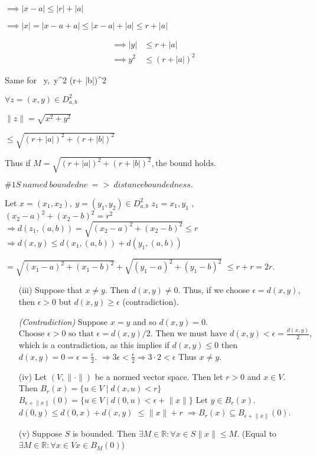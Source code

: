 \documentclass{article}
\theoremstyle{definition}
\numberwithin{equation}{section}
\begin{document}
$\implies |x-a| \leq | r| + | a| $

$\implies|x|=| x - a + a | \leq | x - a| + | a| \leq r + | a|$

\begin{align*}
\implies |y| & \leq r + |a| \\
\implies y^2 & \leq (r + |a|)^2
\end{align*}

Same for \ y,\ y^2 \leq (r+ |b|)^2 

$\forall z = (x,y) \in D^2_{a,b} $

$\|z\| = \sqrt{x^2 + y^2}$

$\leq \sqrt{(r+|a|)^2 + (r+|b|)^2}$

Thus if $M = \sqrt{(r+|a|)^2 + (r + |b|)^2} , \text{the bound holds.}$

$ \# 1S \ named \ boundedne \ =>\ distance boundedness. $

Let 
$x = (x_1, x_2), \ y = (y_1, y_2) \in D^2_{a,b} $
$ z_1 = {x_1,y_1} $ ,
$ (x_2 - a)^2 + (x_2 - b)^2 = r^2 $
$\Rightarrow d(z_1,(a,b)) = \sqrt{(x_2 - a)^2 + (x_2 - b)^2} \le r $
$\Rightarrow d(x,y) \leq d(x_1,(a,b)) + d(y_1,(a,b)) $

$ = \sqrt{(x_1 - a)^2 +(x_1 - b)^2} + \sqrt{(y_1 - a)^2 +(y_1 - b)^2} $ 
$ \le r + r = 2r. $
\begin{enumerate}
    \item[(iii)] Suppose that \(x \neq y\). Then \(d(x, y) \neq 0\). Thus, if we choose \(\epsilon = d(x, y)\), then \(\epsilon > 0\) but \(d(x, y) \geq \epsilon\) (contradiction).

    \textit{(Contradiction)} Suppose \(x = y\) and so \(d(x, y) = 0\).
    $
    \text{Choose } \epsilon > 0 \text{ so that } \epsilon = d(x, y)/2. \text{ Then we must have } d(x, y) < \epsilon = \frac{d(x, y)}{2},
    $
    which is a contradiction, as this implies if \(d(x, y) \leq 0\) then \(d(x, y) = 0 = \epsilon = \frac{\epsilon}{2}\).
    $
    \Rightarrow 3\epsilon < \frac{\epsilon}{2} \Rightarrow 3 \cdot 2 < \epsilon
    $
    Thus \(x \neq y\).

    \item[(iv)] Let \((V, \lVert \cdot \rVert)\) be a normed vector space. Then let \(r > 0\) and \(x \in V\). Then
    $
    B_r(x) = \{ u \in V \mid d(x, u) < r \}
    $
    $
    B_{\epsilon + \lVert x \rVert}(0) = \{ u \in V \mid d(0, u) < \epsilon + \lVert x \rVert \}
    $
    $
    \text{Let } y \in B_r(x).
    $
    $
    d(0, y) \leq d(0, x) + d(x, y)
    $
    $
    \leq \lVert x \rVert + r
    $
    $
    \Rightarrow B_r(x) \subseteq B_{\epsilon + \lVert x \rVert}(0).
    $

    \item[(v)] Suppose \(S\) is bounded. Then \(\exists M \in \mathbb{R} : \forall x\in S \lVert x \rVert \leq M\). (Equal to \(\exists M \in \mathbb{R} : \forall x \in V x \in B_M(0)\))
\end{enumerate}
\end{document}
